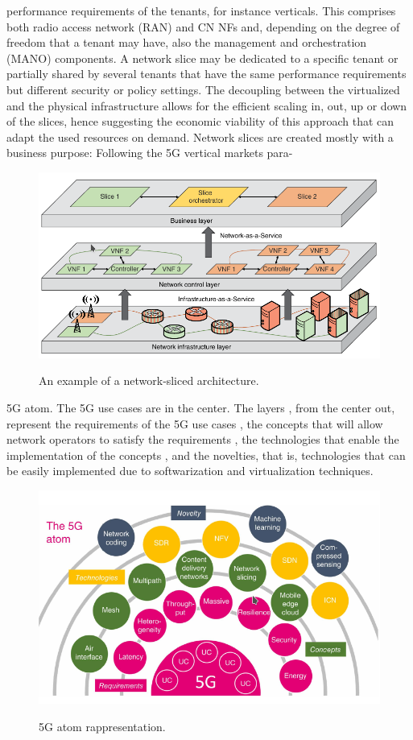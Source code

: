\documentclass{article}
\begin{document}
­performance requirements of the tenants, for instance verticals. This comprises both radio access
network (RAN) and CN NFs and, depending on the degree of freedom that a tenant may have, also
the management and orchestration (MANO) components. A network slice may be dedicated to a
specific tenant or partially shared by several tenants that have the same performance requirements
but ­different security or policy settings. The decoupling between the virtualized and the physical
­infrastructure allows for the efficient scaling in, out, up or down of the slices, hence suggesting the
economic viability of this approach that can adapt the used resources on demand.
Network slices are created mostly with a business purpose: Following the 5G vertical markets para-
\begin{figure}[h]
\centering
\includegraphics[scale=0.6]{pics/slice.png}
\label{slice}
\caption{An example of a network‐sliced architecture.} 
\end{figure}
5G atom. The 5G use cases are in the center. The layers , from the center out,
represent the requirements of the 5G use cases , the concepts that will allow network
operators to satisfy the requirements , the technologies that enable the implementation of
the concepts , and the novelties, that is, technologies that can be easily implemented due
to softwarization and virtualization techniques.
\begin{figure}[h]
\centering
\includegraphics[scale=0.5]{pics/5g_atom.png} 
\label{atom}
\caption{5G atom rappresentation.}
\end{figure}
\end{document}
